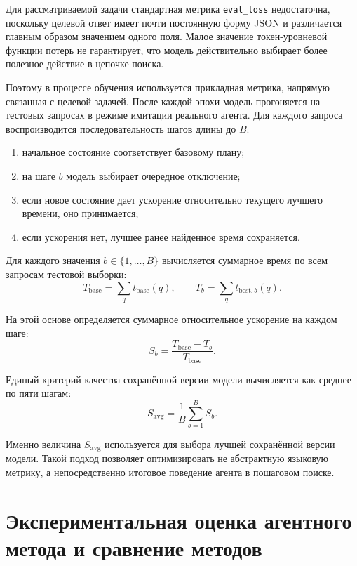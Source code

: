 Для рассматриваемой задачи стандартная метрика \texttt{eval\_loss} недостаточна, поскольку целевой ответ имеет почти постоянную форму JSON и различается главным образом значением одного поля. Малое значение токен-уровневой функции потерь не гарантирует, что модель действительно выбирает более полезное действие в цепочке поиска.

Поэтому в процессе обучения используется прикладная метрика, напрямую связанная с целевой задачей. После каждой эпохи модель прогоняется на тестовых запросах в режиме имитации реального агента. Для каждого запроса воспроизводится последовательность шагов длины до $B$:
\begin{enumerate}
    \item начальное состояние соответствует базовому плану;
    \item на шаге $b$ модель выбирает очередное отключение;
    \item если новое состояние дает ускорение относительно текущего лучшего времени, оно принимается;
    \item если ускорения нет, лучшее ранее найденное время сохраняется.
\end{enumerate}

Для каждого значения $b \in \{1,\dots,B\}$ вычисляется суммарное время по всем запросам тестовой выборки:
\begin{equation}
    T_{\mathrm{base}} = \sum_q t_{\mathrm{base}}(q), \qquad
    T_b = \sum_q t_{\mathrm{best},b}(q).
\end{equation}

На этой основе определяется суммарное относительное ускорение на каждом шаге:
\begin{equation}
    S_b = \frac{T_{\mathrm{base}} - T_b}{T_{\mathrm{base}}}.
\end{equation}

Единый критерий качества сохранённой версии модели вычисляется как среднее по пяти шагам:
\begin{equation}
    S_{\mathrm{avg}} = \frac{1}{B}\sum_{b=1}^{B}S_b.
\end{equation}

Именно величина $S_{\mathrm{avg}}$ используется для выбора лучшей сохранённой версии модели. Такой подход позволяет оптимизировать не абстрактную языковую метрику, а непосредственно итоговое поведение агента в пошаговом поиске.

\section{Экспериментальная оценка агентного метода и сравнение методов}\label{sec:ch4_experiments}

